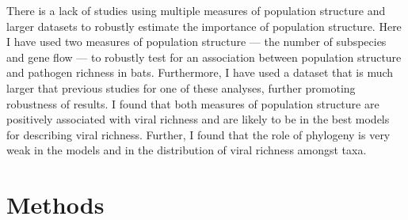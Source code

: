 There is a lack of studies using multiple measures of population structure and larger datasets to robustly estimate the importance of population structure.
Here I have used two measures of population structure --- the number of subspecies and gene flow --- to robustly test for an association between population structure and pathogen richness in bats.
Furthermore, I have used a dataset that is much larger that previous studies for one of these analyses, further promoting robustness of results.
I found that both measures of population structure are positively associated with viral richness and are likely to be in the best models for describing viral richness.
Further, I found that the role of phylogeny is very weak in the models and in the distribution of viral richness amongst taxa.



\section{Methods}




















































































